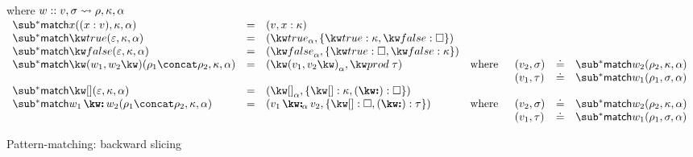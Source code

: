 \begin{figure}[H]
\flushleft {}
 where $w :: v, \sigma \rightsquigarrow \rho, \kappa, \alpha$ \\
 \small
\vspace{3mm}
$\begin{array}{lllll}
   \matchBwdF{\matchVarNew{x}}(\bind{x}{v}, \kappa, \alpha)
   &=&
   (v, \elimVar{x}{\kappa})
   \\
   \matchBwdF{\matchTrueNew}(\seqEmpty, \kappa, \alpha)
   &=&
   (\annTrue{\alpha}, \elimBool{\kappa}{\hole})
   \\
   \matchBwdF{\matchFalseNew}(\seqEmpty, \kappa, \alpha)
   &=&
   (\annFalse{\alpha}, \elimBool{\hole}{\kappa})
   \\
   \matchBwdF{\matchPair{w_1}{w_2}}(\rho_1 \concat \rho_2, \kappa, \alpha)
   &=&
   (\annPair{v_1}{v_2}{\alpha}, \elimProd{\tau})
   &\text{where}&
   \begin{array}[t]{lll}
      (v_2, \sigma) &\eq& \matchBwdF{w_2}(\rho_2, \kappa, \alpha)
      \\
      (v_1, \tau) &\eq& \matchBwdF{w_1}(\rho_1, \sigma, \alpha)
   \end{array}
   \\
   \matchBwdF{\matchNilNew}(\seqEmpty,\kappa,\alpha)
   &=&
   (\annNil{\alpha}, \elimList{\kappa}{\hole})
   \\
   \matchBwdF{\matchConsNew{w_1}{w_2}}(\rho_1 \concat \rho_2, \kappa, \alpha)
   &=&
   (\annCons{v_1}{v_2}{\alpha}, \elimList{\hole}{\tau})
   &\text{where}&
   \begin{array}[t]{lll}
      (v_2, \sigma) &\eq& \matchBwdF{w_2}(\rho_2, \kappa, \alpha)
      \\
      (v_1, \tau) &\eq& \matchBwdF{w_1}(\rho_1, \sigma, \alpha)
   \end{array}
\end{array}$

\vspace{5mm}
\flushleft {}
\begin{smathpar}
   {
   }
\end{smathpar}
\caption{Pattern-matching: backward slicing}
\end{figure}
